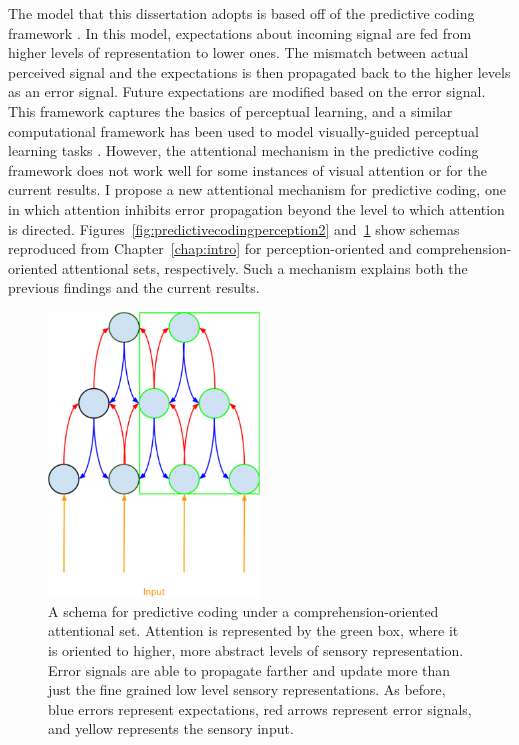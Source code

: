 The model that this dissertation adopts is based off of the predictive coding framework \citep{Clark2013}.
In this model, expectations about incoming signal are fed from higher levels of representation to lower ones.
The mismatch between actual perceived signal and the expectations is then propagated back to the higher levels as an error signal.
Future expectations are modified based on the error signal.
This framework captures the basics of perceptual learning, and a similar computational framework has been used to model visually-guided perceptual learning tasks \citep{Kleinschmidt2011}.
However, the attentional mechanism in the predictive coding framework does not work well for some instances of visual attention \citep{Block2013} or for the current results.
I propose a new attentional mechanism for predictive coding, one in which attention inhibits error propagation beyond the level to which attention is directed.
Figures~\ref{fig:predictivecodingperception2} and~\ref{fig:predictivecodingcomprehension2} show schemas reproduced from Chapter~\ref{chap:intro} for perception-oriented and comprehension-oriented attentional sets, respectively.
Such a mechanism explains both the previous findings and the current results.

\begin{figure}[!ht]
\caption{A schema for predictive coding under a comprehension-oriented attentional set. Attention is represented by the green box, where it is oriented to higher, more abstract levels of sensory representation.  Error signals are able to propagate farther and update more than just the fine grained low level sensory representations. As before, blue errors represent expectations, red arrows represent error signals, and yellow represents the sensory input.}
\label{fig:predictivecodingcomprehension2}
\begin{center}
\includegraphics[width=0.5\textwidth]{pictures/comprehension_predictive_coding}
\end{center}
\end{figure}

